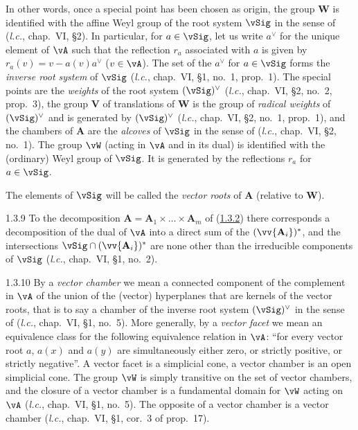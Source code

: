 \documentclass[12pt,a4paper,oneside,english]{smfart}
\makeatletter
\newcommand{\btanchor}[1]{\leavevmode\Hy@raisedlink{\hypertarget{bt:#1}{}}}
\newcommand{\btref}[1]{\hyperlink{bt:#1}{#1}}
\theoremstyle{definition}
\theoremstyle{bt}
\makeatother
\begin{document}
In other words, once a special point has been chosen as origin, the group $\mathbf{W}$ is identified with the affine Weyl group of the root system $\vSig$ in the sense of (\emph{l.c.}, chap.~VI, \S2). In particular, for $a\in\vSig$, let us write $a^{\vee}$ for the unique element of $\vA$ such that the reflection $r_a$ associated with $a$ is given by $r_a(v)=v-a(v)a^{\vee}$ ($v\in\vA$). The set of the $a^{\vee}$ for $a\in\vSig$ forms the \emph{inverse root system} of $\vSig$ (\emph{l.c.}, chap.~VI, \S1, no.~1, prop.~1). The special points are the \emph{weights} of the root system $(\vSig)^{\vee}$ (\emph{l.c.}, chap.~VI, \S2, no.~2, prop.~3), the group $\mathbf{V}$ of translations of $\mathbf{W}$ is the group of \emph{radical weights} of $(\vSig)^{\vee}$ and is generated by $(\vSig)^{\vee}$ (\emph{l.c.}, chap.~VI, \S2, no.~1, prop.~1), and the chambers of $\mathbf{A}$ are the \emph{alcoves} of $\vSig$ in the sense of (\emph{l.c.}, chap.~VI, \S2, no.~1). The group $\vW$ (acting in $\vA$ and in its dual) is identified with the (ordinary) Weyl group of $\vSig$. It is generated by the reflections $r_a$ for $a\in\vSig$.

The elements of $\vSig$ will be called the \emph{vector roots} of $\mathbf{A}$ (relative to $\mathbf{W}$).

\num{1.3.9}\btanchor{1.3.9} To the decomposition
$\mathbf{A}=\mathbf{A}_1\times\dots\times\mathbf{A}_m$ of (\btref{1.3.2}) there corresponds a decomposition of the dual of $\vA$ into a direct sum of the $(\vv{\mathbf{A}_i})^{*}$, and the intersections $\vSig\cap(\vv{\mathbf{A}_i})^{*}$ are none other than the irreducible components of $\vSig$ (\emph{l.c.}, chap.~VI, \S1, no.~2).

\num{1.3.10}\btanchor{1.3.10} By a \emph{vector chamber} we mean a connected component of the
complement in $\vA$ of the union of the (vector) hyperplanes that are kernels of the vector roots, that is to say a chamber of the inverse root system $(\vSig)^{\vee}$ in the sense of (\emph{l.c.}, chap.~VI, \S1, no.~5). More generally, by a \emph{vector facet} we mean an equivalence class for the following equivalence relation in $\vA$: ``for every vector root $a$, $a(x)$ and $a(y)$ are simultaneously either zero, or strictly positive, or strictly negative''. A vector facet is a simplicial cone, a vector chamber is an open simplicial cone. The group $\vW$ is simply transitive on the set of vector chambers, and the closure of a vector chamber is a fundamental domain for $\vW$ acting on $\vA$ (\emph{l.c.}, chap.~VI, \S1, no.~5). The opposite of a vector chamber is a vector chamber (\emph{l.c.}, chap.~VI, \S1, cor.~3 of prop.~17).
\end{document}
